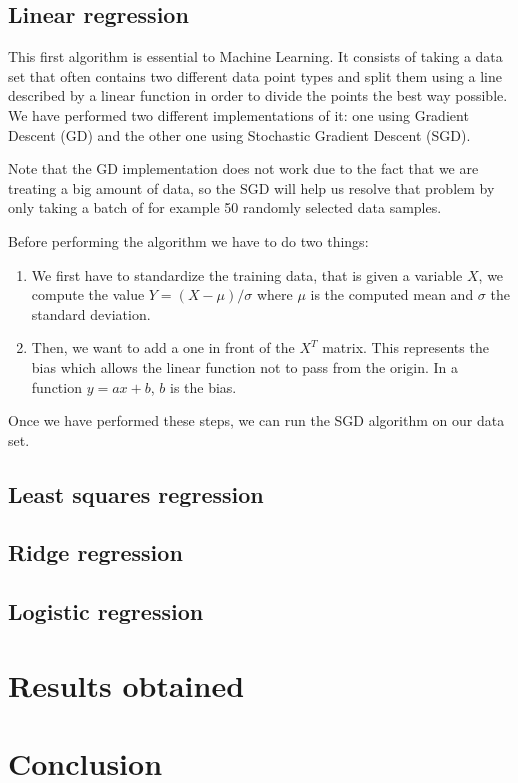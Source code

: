\documentclass[10pt,conference,compsocconf]{IEEEtran}
\begin{document}
\subsection{Linear regression}
This first algorithm is essential to Machine Learning. It consists of taking a data set that often contains two different data point types and split them using a line described by a linear function in order to divide the points the best way possible. We have performed two different implementations of it: one using Gradient Descent (GD) and the other one using Stochastic Gradient Descent (SGD).\par
Note that the GD implementation does not work due to the fact that we are treating a big amount of data, so the SGD will help us resolve that problem by only taking a batch of for example 50 randomly selected data samples.\par
Before performing the algorithm we have to do two things:
\begin{enumerate}
  \item We first have to standardize the training data, that is given a variable $X$, we compute the value $Y=(X-\mu)/\sigma$ where $\mu$ is the computed mean and $\sigma$ the standard deviation.
  \item Then, we want to add a one in front of the $X^T$ matrix. This represents the bias which allows the linear function not to pass from the origin. In a function $y=ax+b$, $b$ is the bias.
\end{enumerate}
Once we have performed these steps, we can run the SGD algorithm on our data set.


\subsection{Least squares regression}

\subsection{Ridge regression}

\subsection{Logistic regression}

\section{Results obtained}

\section{Conclusion}

% 
% 
\end{document}
